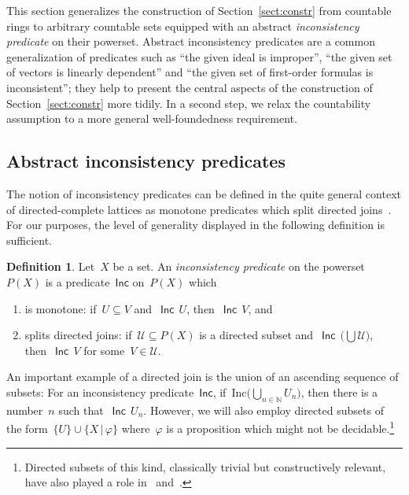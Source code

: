 \documentclass[com,11pt,crcready]{iosart2x}
\theoremstyle{definition}
\newtheorem{definition}{Definition}[section]
\theoremstyle{plain}
\theoremstyle{remark}
\newcommand{\Incbare}{\mathsf{Inc}}
\newcommand{\Inc}[1]{\operatorname{\Incbare}\,#1}
\newcommand{\?}{\,{:}\,}
\newcommand{\NN}{\mathbb{N}}
\renewcommand{\_}{\mathpunct{.}\,}
\begin{document}
This section generalizes the construction of Section~\ref{sect:constr} from
countable rings to arbitrary countable sets equipped with an abstract
\emph{inconsistency predicate} on their powerset. Abstract inconsistency
predicates are a common generalization of predicates such as ``the given ideal is
improper'', ``the given set of vectors is linearly dependent'' and ``the given
set of first-order formulas is inconsistent''; they help to present the
central aspects of the construction of Section~\ref{sect:constr} more tidily.
In a second step, we relax the countability assumption to a more general
well-foundedness requirement.


\subsection{Abstract inconsistency predicates}

The notion of inconsistency predicates can be defined in the quite general
context of directed-complete lattices as monotone predicates which split
directed joins~\cite{schuster-wessel:jacincpred}. For our purposes, the level of generality displayed in the
following definition is sufficient.

\begin{definition}Let~$X$ be a set. An \emph{inconsistency predicate} on the
powerset~$P(X)$ is a predicate~$\Incbare$ on~$P(X)$ which
\begin{enumerate}
\item is monotone: if~$U \subseteq V$ and~$\Inc{U}$, then~$\Inc{V}$, and
\item splits directed joins: if~$\mathcal{U} \subseteq P(X)$ is a directed subset
and~$\Inc{\bigl(\bigcup \mathcal{U}\bigr)}$, then~$\Inc{V}$ for some~$V \in \mathcal{U}$.
\end{enumerate}
\end{definition}

An important example of a directed join is the union of an ascending sequence
of subsets: For an inconsistency predicate~$\Incbare$, if~$\mathrm{Inc}{\bigl(\bigcup_{n \in \NN}
U_n\bigr)}$, then there is a number~$n$ such that~$\Inc{U_n}$. However, we will also
employ directed subsets of the form~$\{ U \} \cup \{ X \,|\, \varphi \}$
where~$\varphi$ is a proposition which might not be
decidable.\footnote{Directed subsets of this kind, classically trivial but
constructively relevant, have also played a role
in~\cite[Lemma~1]{schuster-wessel:jacincpred}
and~\cite[Example~I.1.7(2)]{moerdijk-vermeulen:proper-maps}.}
\end{document}
